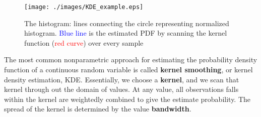 \begin{figure}[hbt]
  \centerline{\texttt{[image: ./images/KDE\_example.eps]}}
\caption{The histogram: lines connecting the circle representing normalized
histogram. \textcolor{blue}{Blue line} is the estimated PDF by scanning the
kernel function (\textcolor{red}{red curve}) over every sample }
\label{fig:KDE_example} 
\end{figure}

The most common nonparametric approach for estimating the probability density
function of a continuous random variable is called {\bf kernel smoothing}, or
kernel density estimation, KDE. Essentially, we choose a {\bf kernel}, and we
scan that kernel through out the domain of values.
At any value, all observations falls within the kernel are weightedly combined
to give the estimate probability. The spread of the kernel is determined by the
value {\bf bandwidth}.
 
